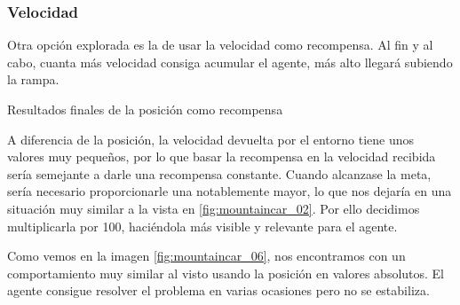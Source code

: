 


\subsubsection*{Velocidad}

Otra opción explorada es la de usar la velocidad como recompensa. Al fin y al cabo, cuanta más velocidad consiga acumular el agente, más alto llegará subiendo la rampa.^^^^^^^^^^^^

%
       {Resultados finales de la posición como recompensa}

A diferencia de la posición, la velocidad devuelta por el entorno tiene unos valores muy pequeños, por lo que basar la recompensa en la velocidad recibida sería semejante a darle una recompensa constante. Cuando alcanzase la meta, sería necesario proporcionarle una notablemente mayor, lo que nos dejaría en una situación muy similar a la vista en \ref{fig:mountaincar_02}. Por ello decidimos multiplicarla por 100, haciéndola más visible y relevante para el agente. 

Como vemos en la imagen \ref{fig:mountaincar_06}, nos encontramos con un comportamiento muy similar al visto usando la posición en valores absolutos. El agente consigue resolver el problema en varias ocasiones pero no se estabiliza.



